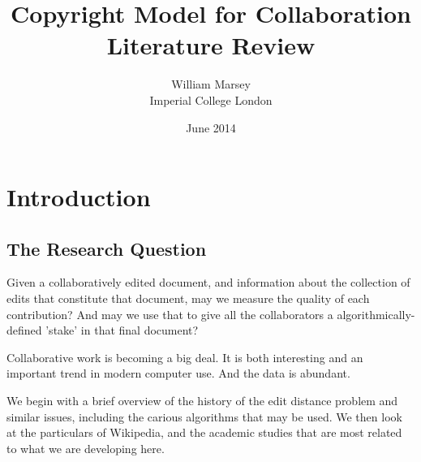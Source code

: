 \documentclass[a4paper,11pt,twoside,notitlepage]{article}
\begin{document}
	\title{Copyright Model for Collaboration
		\\ \small Literature Review}
	\author{William Marsey
		\\Imperial College London}
	\date{June 2014}
 	\maketitle	
        

        \section{Introduction}
        \subsection{The Research Question}
        Given a collaboratively edited document, and information about
        the collection of edits that constitute that document, may we
        measure the quality of each contribution? And may we use that
        to give all the collaborators a algorithmically-defined 'stake'
        in that final document?
        
        Collaborative work is becoming a big deal. It is both
        interesting and an important trend in modern computer
        use. And the data is abundant. 
        
        We begin with a brief overview of the history of
        the edit distance problem and similar issues, including the
        carious algorithms that may be used. We then look at the
        particulars of Wikipedia, and the academic studies that are
        most related to what we are developing here.

\end{document}
